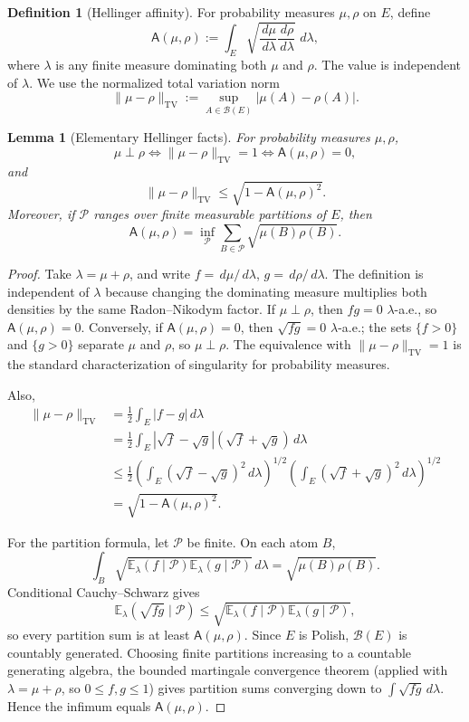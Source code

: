 \documentclass[12pt]{article}
\newcommand{\E}{\mathbb E}
\newcommand{\1}{\mathbf 1}
\newcommand{\dd}{\,d}
\newcommand{\TV}{\mathrm{TV}}
\newcommand{\Aff}{\mathsf A}
\newcommand{\cB}{\mathcal B}
\theoremstyle{plain}
\newtheorem{lemma}[theorem]{Lemma}
\theoremstyle{definition}
\newtheorem{definition}[theorem]{Definition}
\theoremstyle{remark}
\numberwithin{equation}{section}
\begin{document}
\begin{definition}[Hellinger affinity]
For probability measures \(\mu,\rho\) on \(E\), define
\[
\Aff(\mu,\rho)
:=
\int_E\sqrt{\frac{\dd\mu}{\dd\lambda}\frac{\dd\rho}{\dd\lambda}}\,\dd\lambda,
\]
where \(\lambda\) is any finite measure dominating both \(\mu\) and \(\rho\).
The value is independent of \(\lambda\).  We use the normalized total variation
norm
\[
\|\mu-\rho\|_{\TV}:=\sup_{A\in\cB(E)}|\mu(A)-\rho(A)|.
\]
\end{definition}

\begin{lemma}[Elementary Hellinger facts]\label{lem:hellfacts}
For probability measures \(\mu,\rho\),
\[
\mu\perp\rho
\iff
\|\mu-\rho\|_{\TV}=1
\iff
\Aff(\mu,\rho)=0,
\]
and
\[
\|\mu-\rho\|_{\TV}
\le
\sqrt{1-\Aff(\mu,\rho)^2}.
\]
Moreover, if \(\mathcal P\) ranges over finite measurable partitions of \(E\),
then
\[
\Aff(\mu,\rho)
=
\inf_{\mathcal P}\sum_{B\in\mathcal P}\sqrt{\mu(B)\rho(B)}.
\]
\end{lemma}

\begin{proof}
Take \(\lambda=\mu+\rho\), and write \(f=\dd\mu/\dd\lambda\),
\(g=\dd\rho/\dd\lambda\).  The definition is independent of \(\lambda\) because
changing the dominating measure multiplies both densities by the same
Radon--Nikodym factor.  If \(\mu\perp\rho\), then \(fg=0\) \(\lambda\)-a.e., so
\(\Aff(\mu,\rho)=0\).  Conversely, if \(\Aff(\mu,\rho)=0\), then
\(\sqrt{fg}=0\) \(\lambda\)-a.e.; the sets \(\{f>0\}\) and \(\{g>0\}\) separate
\(\mu\) and \(\rho\), so \(\mu\perp\rho\).  The equivalence with
\(\|\mu-\rho\|_{\TV}=1\) is the standard characterization of singularity for
probability measures.

Also,
\[
\begin{aligned}
\|\mu-\rho\|_{\TV}
&=\frac12\int_E|f-g|\dd\lambda                                      \\
&=\frac12\int_E|\sqrt f-\sqrt g|(\sqrt f+\sqrt g)\dd\lambda          \\
&\le \frac12
\left(\int_E(\sqrt f-\sqrt g)^2\dd\lambda\right)^{1/2}
\left(\int_E(\sqrt f+\sqrt g)^2\dd\lambda\right)^{1/2}               \\
&=\sqrt{1-\Aff(\mu,\rho)^2}.
\end{aligned}
\]

For the partition formula, let \(\mathcal P\) be finite.  On each atom \(B\),
\[
\int_B\sqrt{\E_\lambda(f\mid\mathcal P)\E_\lambda(g\mid\mathcal P)}\dd\lambda
=
\sqrt{\mu(B)\rho(B)}.
\]
Conditional Cauchy--Schwarz gives
\[
\E_\lambda(\sqrt{fg}\mid\mathcal P)
\le
\sqrt{\E_\lambda(f\mid\mathcal P)\E_\lambda(g\mid\mathcal P)},
\]
so every partition sum is at least \(\Aff(\mu,\rho)\).  Since \(E\) is Polish,
\(\cB(E)\) is countably generated.  Choosing finite partitions increasing to a
countable generating algebra, the bounded martingale convergence theorem
(applied with \(\lambda=\mu+\rho\), so \(0\le f,g\le1\)) gives partition sums
converging down to \(\int\sqrt{fg}\dd\lambda\).  Hence the infimum equals
\(\Aff(\mu,\rho)\).
\end{proof}
\end{document}
